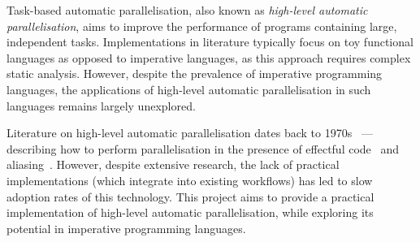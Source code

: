 \vspace{2mm}


\vspace{3mm}

\newpage 

Task-based automatic parallelisation, also known as \textit{high-level automatic parallelisation}, aims to improve the performance of programs containing large, independent tasks. Implementations in literature typically focus on toy functional languages as opposed to imperative languages, as this approach requires complex static analysis. However, despite the prevalence of imperative programming languages, the applications of high-level automatic parallelisation in such languages remains largely unexplored. 

Literature on high-level automatic parallelisation dates back to 1970s~\cite{10.1145/1478462.1478537} — describing how to perform parallelisation in the presence of effectful code~\cite{10.1145/73560.73564} and aliasing~\cite{10.1007/978-3-540-30579-8_14}. However, despite extensive research, the lack of practical implementations (which integrate into existing workflows) has led to slow adoption rates of this technology. This project aims to provide a practical implementation of high-level automatic parallelisation, while exploring its potential in imperative programming languages. 

